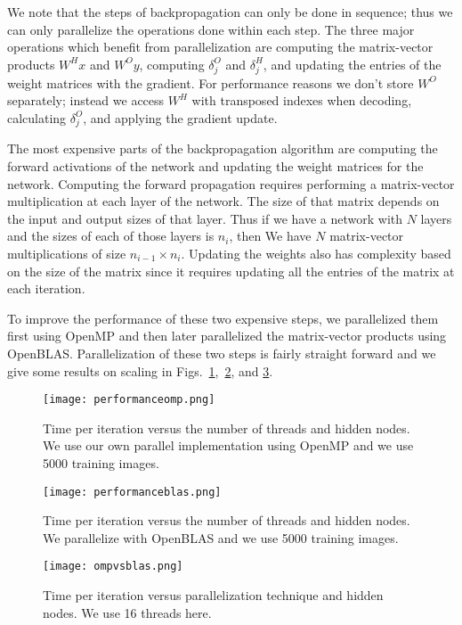 We note that the steps of backpropagation can only be done in sequence; thus we can only parallelize the operations done within each step. The three major operations which benefit from parallelization are computing the matrix-vector products $W^{H}x$ and $W^{O}y$, computing $\delta^O_j$ and $\delta^H_j$, and updating the entries of the weight matrices with the gradient. For performance reasons we don't store $W^O$ separately; instead we access $W^H$ with transposed indexes when decoding, calculating $\delta^O_j$, and applying the gradient update.

The most expensive parts of the backpropagation algorithm are computing the forward activations of the network and updating the weight matrices for the network. Computing the forward propagation requires performing a matrix-vector multiplication at each layer of the network. The size of that matrix depends on the input and output sizes of that layer. Thus if we have a network with $N$ layers and the sizes of each of those layers is $n_i$, then We have $N$ matrix-vector multiplications of size $n_{i-1} \times n_i$. Updating the weights also has complexity based on the size of the matrix since it requires updating all the entries of the matrix at each iteration.

To improve the performance of these two expensive steps, we parallelized them first using OpenMP and then later parallelized the matrix-vector products using OpenBLAS. Parallelization of these two steps is fairly straight forward and we give some results on scaling in Figs.~\ref{fig:performanceomp},~\ref{fig:performanceblas}, and \ref{fig:ompvsblas}.


\begin{figure}[h]
\centering
\texttt{[image: performanceomp.png]}
\caption{Time per iteration versus the number of threads and hidden nodes. We use our own parallel implementation using OpenMP and we use 5000 training images.}
\label{fig:performanceomp}
\end{figure}


\begin{figure}[h]
\centering
\texttt{[image: performanceblas.png]}
\caption{Time per iteration versus the number of threads and hidden nodes. We parallelize with OpenBLAS and we use 5000 training images.}
\label{fig:performanceblas}
\end{figure}

\begin{figure}[h]
\centering
\texttt{[image: ompvsblas.png]}
\caption{Time per iteration versus parallelization technique and hidden nodes. We use 16 threads here.}
\label{fig:ompvsblas}
\end{figure}

